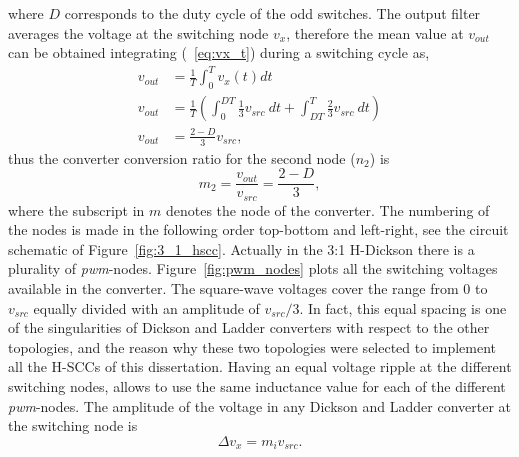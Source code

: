 where $D$ corresponds to the duty cycle of the odd switches. The output filter averages the voltage at the switching node $v_x$, therefore the mean value at $v_{out}$ can be obtained integrating (~\ref{eq:vx_t}) during a switching cycle as,
\begin{align}
 v_{out} & = \frac{1}{T} \int_{0}^{T}  v_x(t) dt \\[3ex]
 v_{out} & = \frac{1}{T} \left( \int_{0}^{DT} \frac{1}{3} v_{src} ~dt + \int_{DT}^{T} \frac{2}{3} v_{src} ~dt \right) \\[3ex]
 v_{out} & = \frac{2-D}{3} v_{src},
 \label{eq:int_vx_t}
\end{align}
thus the converter conversion ratio for the second node ($n_2$) is
\begin{equation}
 m_2   = \frac{v_{out}}{v_{src}} = \frac{2-D}{3},
 \label{eq:int_vx_t}
\end{equation}
where the subscript in $m$ denotes the node of the converter. The numbering of the nodes is made in the following order top-bottom and left-right, see the circuit schematic of Figure~\ref{fig:3_1_hscc}. Actually in the 3:1 H-Dickson there is a plurality of \emph{pwm}-nodes. Figure~\ref{fig:pwm_nodes} plots all the switching voltages available in the converter. The square-wave voltages cover the range from 0 to $v_{src}$ equally divided with an amplitude of $v_{src}/3$. In fact, this equal spacing is one of the singularities of Dickson and Ladder converters with respect to the other topologies, and the reason why these two topologies were selected to implement all the H-SCCs of this dissertation. Having an equal voltage ripple at the different switching nodes, allows to use the same inductance value for each of the different \emph{pwm}-nodes. The amplitude of the voltage in any Dickson and Ladder converter at the switching node is
\begin{equation}
\Delta v_x = m_i v_{src}.
\label{eq:del_vx}
\end{equation}

